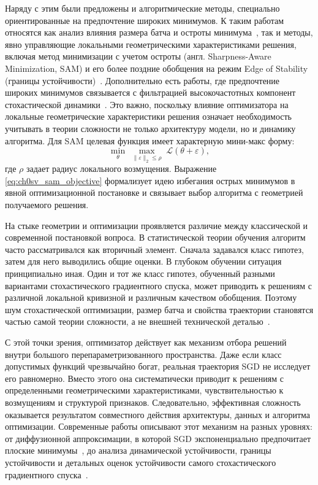 Наряду с этим были предложены и алгоритмические методы, специально ориентированные на предпочтение широких минимумов.
К таким работам относятся как анализ влияния размера батча и остроты минимума~\cite{keskar2017largebatch}, так и методы, явно управляющие локальными геометрическими характеристиками решения, включая метод минимизации с учетом остроты (англ. Sharpness-Aware Minimization, SAM) и его более поздние обобщения на режим Edge of Stability (границы устойчивости)~\cite{foret2021sam,sam2023eos}.
Дополнительно есть работы, где предпочтение широких минимумов связывается с фильтрацией высокочастотных компонент стохастической динамики~\cite{lowpass2022flat}.
Это важно, поскольку влияние оптимизатора на локальные геометрические характеристики решения означает необходимость учитывать в теории сложности не только архитектуру модели, но и динамику алгоритма.
Для SAM целевая функция имеет характерную мини-макс форму:
\begin{equation}
\min_{\theta}\;\max_{\|\varepsilon\|_2\le \rho}\;\mathcal L(\theta+\varepsilon),
\label{eq:ch0sv_sam_objective}
\end{equation}
где $\rho$ задает радиус локального возмущения.
Выражение \eqref{eq:ch0sv_sam_objective} формализует идею избегания острых минимумов в явной оптимизационной постановке и связывает выбор алгоритма с геометрией получаемого решения.

На стыке геометрии и оптимизации проявляется различие между классической и современной постановкой вопроса.
В статистической теории обучения алгоритм часто рассматривался как вторичный элемент.
Сначала задавался класс гипотез, затем для него выводились общие оценки.
В глубоком обучении ситуация принципиально иная.
Один и тот же класс гипотез, обученный разными вариантами стохастического градиентного спуска, может приводить к решениям с различной локальной кривизной и различным качеством обобщения.
Поэтому шум стохастической оптимизации, размер батча и свойства траектории становятся частью самой теории сложности, а не внешней технической деталью~\cite{hardt2016train,bousquet2002stability}.

С этой точки зрения, оптимизатор действует как механизм отбора решений внутри большого перепараметризованного пространства.
Даже если класс допустимых функций чрезвычайно богат, реальная траектория SGD не исследует его равномерно.
Вместо этого она систематически приводит к решениям с определенными геометрическими характеристиками, чувствительностью к возмущениям и структурой признаков.
Следовательно, эффективная сложность оказывается результатом совместного действия архитектуры, данных и алгоритма оптимизации.
Современные работы описывают этот механизм на разных уровнях: от диффузионной аппроксимации, в которой SGD экспоненциально предпочитает плоские минимумы~\cite{wu2020sgdflat}, до анализа динамической устойчивости, границы устойчивости и детальных оценок устойчивости самого стохастического градиентного спуска~\cite{sgdstability2023,sgd2020stability,mei2021eos}.

